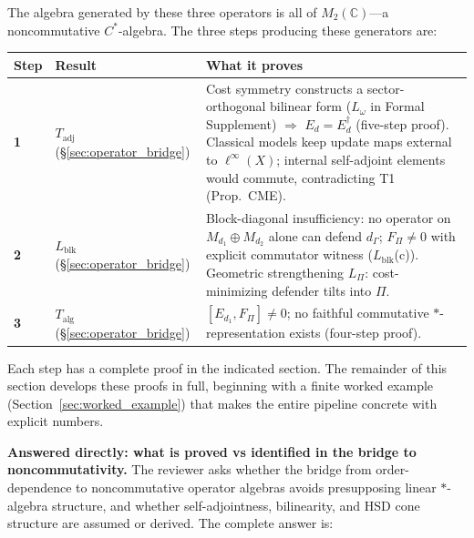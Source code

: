 \documentclass[11pt]{article}
\theoremstyle{remark}
\begin{document}
\smallskip\noindent The algebra generated by these three operators is all of $M_2(\mathbb{C})$---a noncommutative $C^*$-algebra.  The three steps producing these generators are:

\smallskip
\begin{center}
\smallskip
\begin{tabular}{@{}p{1.2cm}p{3.0cm}p{8.2cm}@{}}
\textbf{Step} & \textbf{Result} & \textbf{What it proves} \\[2pt]
\hline\noalign{\smallskip}
\textbf{1} & $T_{\mathrm{adj}}$ (\S\ref{sec:operator_bridge}) & Cost symmetry constructs a sector-orthogonal bilinear form ($L_\omega$ in Formal Supplement) $\Rightarrow$ $E_d = E_d^\dagger$ (five-step proof).  Classical models keep update maps external to $\ell^\infty(X)$; internal self-adjoint elements would commute, contradicting T1 (Prop.~CME). \\[3pt]
\textbf{2} & $L_{\mathrm{blk}}$ (\S\ref{sec:operator_bridge}) & Block-diagonal insufficiency: no operator on $M_{d_1} \oplus M_{d_2}$ alone can defend $d_\Gamma$; $F_\Pi \ne 0$ with explicit commutator witness ($L_{\mathrm{blk}}$(c)).  Geometric strengthening $L_\Pi$: cost-minimizing defender tilts into $\Pi$. \\[3pt]
\textbf{3} & $T_{\mathrm{alg}}$ (\S\ref{sec:operator_bridge}) & $[E_{d_1}, F_\Pi] \ne 0$; no faithful commutative $*$-representation exists (four-step proof). \\
\end{tabular}
\label{tab:bridge_steps}
\end{center}

\smallskip\noindent Each step has a complete proof in the indicated section.  The remainder of this section develops these proofs in full, beginning with a finite worked example (Section~\ref{sec:worked_example}) that makes the entire pipeline concrete with explicit numbers.


\textbf{Answered directly: what is proved vs identified in the bridge to noncommutativity.}  The reviewer asks whether the bridge from order-dependence to noncommutative operator algebras avoids presupposing linear $*$-algebra structure, and whether self-adjointness, bilinearity, and HSD cone structure are assumed or derived.  The complete answer is:
\end{document}
